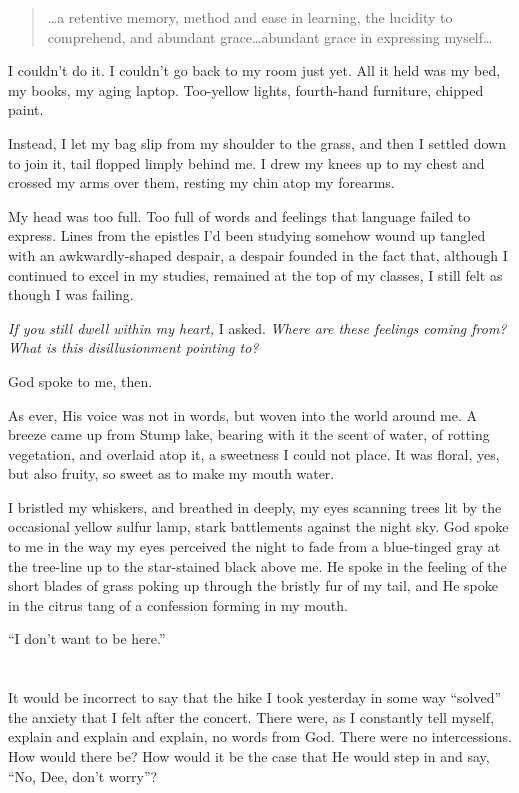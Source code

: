 \begin{quote}
\ldots a retentive memory, method and ease in learning, the lucidity to comprehend, and abundant grace\ldots abundant grace in expressing myself\ldots{}
\end{quote}

I couldn't do it. I couldn't go back to my room just yet. All it held was my bed, my books, my aging laptop. Too-yellow lights, fourth-hand furniture, chipped paint.

Instead, I let my bag slip from my shoulder to the grass, and then I settled down to join it, tail flopped limply behind me. I drew my knees up to my chest and crossed my arms over them, resting my chin atop my forearms.

My head was too full. Too full of words and feelings that language failed to express. Lines from the epistles I'd been studying somehow wound up tangled with an awkwardly-shaped despair, a despair founded in the fact that, although I continued to excel in my studies, remained at the top of my classes, I still felt as though I was failing.

\emph{If you still dwell within my heart,} I asked. \emph{Where are these feelings coming from? What is this disillusionment pointing to?}

God spoke to me, then.

As ever, His voice was not in words, but woven into the world around me. A breeze came up from Stump lake, bearing with it the scent of water, of rotting vegetation, and overlaid atop it, a sweetness I could not place. It was floral, yes, but also fruity, so sweet as to make my mouth water.

I bristled my whiskers, and breathed in deeply, my eyes scanning trees lit by the occasional yellow sulfur lamp, stark battlements against the night sky. God spoke to me in the way my eyes perceived the night to fade from a blue-tinged gray at the tree-line up to the star-stained black above me. He spoke in the feeling of the short blades of grass poking up through the bristly fur of my tail, and He spoke in the citrus tang of a confession forming in my mouth.

``I don't want to be here.''

\section{}

It would be incorrect to say that the hike I took yesterday in some way ``solved'' the anxiety that I felt after the concert. There were, as I constantly tell myself, explain and explain and explain, no words from God. There were no intercessions. How would there be? How would it be the case that He would step in and say, ``No, Dee, don't worry''?

